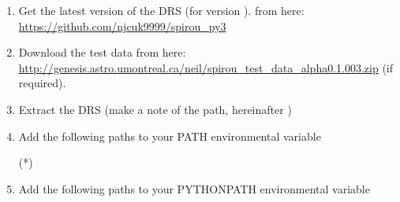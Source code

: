 \begin{enumerate}

\item Get the latest version of the DRS (for \instrument version \MyCodeVersion). from here: \url{https://github.com/njcuk9999/spirou_py3}

\item Download the test data from here: \url{http://genesis.astro.umontreal.ca/neil/spirou_test_data_alpha0.1.003.zip} (if required).

\item Extract the DRS (make a note of the path, hereinafter \InstallDIR)

\item Add the following paths to your PATH environmental variable
\begin{textbox}[title={In "Environmental Variables"}]
(*\InstallDIR*)\bin\;
\end{textbox}

\item Add the following paths to your PYTHONPATH environmental variable
\begin{textbox}[title={In "Environmental Variables"}]
\end{textbox}


\end{enumerate}
